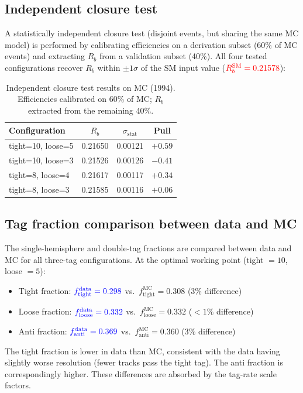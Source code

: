 \documentclass[11pt,a4paper]{article}
\newcommand{\measured}[1]{\textcolor{blue}{#1}}
\newcommand{\external}[1]{\textcolor{red}{#1}}
\begin{document}
\subsection{Independent closure test}
\label{sec:xcheck-closure}

A statistically independent closure test (disjoint events, but
sharing the same MC model) is performed by calibrating
efficiencies on a derivation subset (60\% of MC events) and
extracting $R_b$ from a validation subset (40\%).
All four tested configurations recover $R_b$ within
$\pm 1\sigma$ of the SM input value
($\external{R_b^\text{SM} = 0.21578}$):
\begin{table}[htbp]
\centering
\caption{Independent closure test results on MC (1994).
Efficiencies calibrated on 60\% of MC; $R_b$ extracted from the
remaining 40\%.}
\label{tbl:closure}
\begin{tabular}{lccc}
\toprule
Configuration & $R_b$ & $\sigma_\text{stat}$ & Pull \\
\midrule
tight=10, loose=5 & 0.21650 & 0.00121 & $+0.59$ \\
tight=10, loose=3 & 0.21526 & 0.00126 & $-0.41$ \\
tight=8, loose=4  & 0.21617 & 0.00117 & $+0.34$ \\
tight=8, loose=3  & 0.21585 & 0.00116 & $+0.06$ \\
\bottomrule
\end{tabular}
\end{table}

\subsection{Tag fraction comparison between data and MC}
\label{sec:xcheck-tagfrac}

The single-hemisphere and double-tag fractions are compared between
data and MC for all three-tag configurations.
At the optimal working point (tight $= 10$, loose $= 5$):
\begin{itemize}
\item Tight fraction: $\measured{f_\text{tight}^\text{data} = 0.298}$
  vs.\ $f_\text{tight}^\text{MC} = 0.308$ (3\% difference)
\item Loose fraction: $\measured{f_\text{loose}^\text{data} = 0.332}$
  vs.\ $f_\text{loose}^\text{MC} = 0.332$ ($< 1\%$ difference)
\item Anti fraction: $\measured{f_\text{anti}^\text{data} = 0.369}$
  vs.\ $f_\text{anti}^\text{MC} = 0.360$ (3\% difference)
\end{itemize}
The tight fraction is lower in data than MC, consistent with the
data having slightly worse resolution (fewer tracks pass the tight
tag).
The anti fraction is correspondingly higher.
These differences are absorbed by the tag-rate scale factors.
\end{document}

